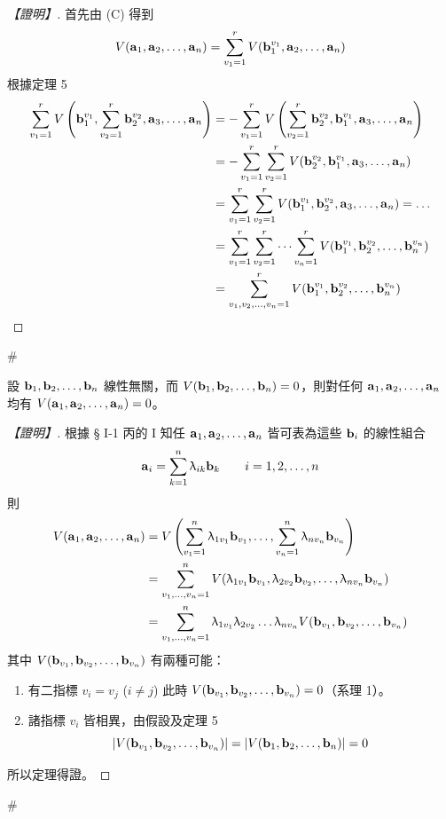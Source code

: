 \begin{proof}[【證明】]
首先由 (C) 得到
\[ V(\boldsymbol{\mathbf{a}}_1, \boldsymbol{\mathbf{a}}_2, \dots, \boldsymbol{\mathbf{a}}_n) = \sum_{v_1=1}^r V(\boldsymbol{\mathbf{b}}_1^{v_1}, \boldsymbol{\mathbf{a}}_2, \dots, \boldsymbol{\mathbf{a}}_n) \]
根據定理 5
\begin{align*}
\sum_{v_1=1}^r V\left(\boldsymbol{\mathbf{b}}_1^{v_1}, \sum_{v_2=1}^r \boldsymbol{\mathbf{b}}_2^{v_2}, \boldsymbol{\mathbf{a}}_3, \dots, \boldsymbol{\mathbf{a}}_n\right) &= - \sum_{v_1=1}^r V\left(\sum_{v_2=1}^r \boldsymbol{\mathbf{b}}_2^{v_2}, \boldsymbol{\mathbf{b}}_1^{v_1}, \boldsymbol{\mathbf{a}}_3, \dots, \boldsymbol{\mathbf{a}}_n\right) \\
&= - \sum_{v_1=1}^r \sum_{v_2=1}^r V(\boldsymbol{\mathbf{b}}_2^{v_2}, \boldsymbol{\mathbf{b}}_1^{v_1}, \boldsymbol{\mathbf{a}}_3, \dots, \boldsymbol{\mathbf{a}}_n) \\
&= \sum_{v_1=1}^r \sum_{v_2=1}^r V(\boldsymbol{\mathbf{b}}_1^{v_1}, \boldsymbol{\mathbf{b}}_2^{v_2}, \boldsymbol{\mathbf{a}}_3, \dots, \boldsymbol{\mathbf{a}}_n) = \dots \\
&= \sum_{v_1=1}^r \sum_{v_2=1}^r \dots \sum_{v_n=1}^r V(\boldsymbol{\mathbf{b}}_1^{v_1}, \boldsymbol{\mathbf{b}}_2^{v_2}, \dots, \boldsymbol{\mathbf{b}}_n^{v_n}) \\
&= \sum_{v_1, v_2, \dots, v_n=1}^r V(\boldsymbol{\mathbf{b}}_1^{v_1}, \boldsymbol{\mathbf{b}}_2^{v_2}, \dots, \boldsymbol{\mathbf{b}}_n^{v_n})
\end{align*}
\end{proof}\hfill$\#$

\begin{theorem}\label{thm:b6s-1-8}
設 $\boldsymbol{\mathbf{b}}_1, \boldsymbol{\mathbf{b}}_2, \dots, \boldsymbol{\mathbf{b}}_n$ 線性無關，而 $V(\boldsymbol{\mathbf{b}}_1, \boldsymbol{\mathbf{b}}_2, \dots, \boldsymbol{\mathbf{b}}_n) = 0$，則對任何 $\boldsymbol{\mathbf{a}}_1, \boldsymbol{\mathbf{a}}_2, \dots, \boldsymbol{\mathbf{a}}_n$ 均有 $V(\boldsymbol{\mathbf{a}}_1, \boldsymbol{\mathbf{a}}_2, \dots, \boldsymbol{\mathbf{a}}_n) = 0$。
\end{theorem}

\begin{proof}[【證明】]
根據 § I-1 丙的 I 知任 $\boldsymbol{\mathbf{a}}_1, \boldsymbol{\mathbf{a}}_2, \dots, \boldsymbol{\mathbf{a}}_n$ 皆可表為這些 $\boldsymbol{\mathbf{b}}_i$ 的線性組合
\begin{equation}
\boldsymbol{\mathbf{a}}_i = \sum_{k=1}^n \uplambda_{ik} \boldsymbol{\mathbf{b}}_k \qquad i=1, 2, \dots, n \label{eq:b6s-1-4-2}
\end{equation}
則
\begin{align*}
V(\boldsymbol{\mathbf{a}}_1, \boldsymbol{\mathbf{a}}_2, \dots, \boldsymbol{\mathbf{a}}_n) &= V\left(\sum_{v_1=1}^n \uplambda_{1v_1} \boldsymbol{\mathbf{b}}_{v_1}, \dots, \sum_{v_n=1}^n \uplambda_{nv_n} \boldsymbol{\mathbf{b}}_{v_n}\right) \\
&= \sum_{v_1, \dots, v_n=1}^n V(\uplambda_{1v_1} \boldsymbol{\mathbf{b}}_{v_1}, \uplambda_{2v_2} \boldsymbol{\mathbf{b}}_{v_2}, \dots, \uplambda_{nv_n} \boldsymbol{\mathbf{b}}_{v_n}) \\
&= \sum_{v_1, \dots, v_n=1}^n \uplambda_{1v_1} \uplambda_{2v_2} \dots \uplambda_{nv_n} V(\boldsymbol{\mathbf{b}}_{v_1}, \boldsymbol{\mathbf{b}}_{v_2}, \dots, \boldsymbol{\mathbf{b}}_{v_n})
\end{align*}
其中 $V(\boldsymbol{\mathbf{b}}_{v_1}, \boldsymbol{\mathbf{b}}_{v_2}, \dots, \boldsymbol{\mathbf{b}}_{v_n})$ 有兩種可能：
\begin{enumerate}[label=(\roman*), leftmargin=2em]
  \item 有二指標 $v_i = v_j$ ($i \ne j$) 此時 $V(\boldsymbol{\mathbf{b}}_{v_1}, \boldsymbol{\mathbf{b}}_{v_2}, \dots, \boldsymbol{\mathbf{b}}_{v_n}) = 0$（系理 1）。
  \item 諸指標 $v_i$ 皆相異，由假設及定理 5
  \[ |V(\boldsymbol{\mathbf{b}}_{v_1}, \boldsymbol{\mathbf{b}}_{v_2}, \dots, \boldsymbol{\mathbf{b}}_{v_n})| = |V(\boldsymbol{\mathbf{b}}_1, \boldsymbol{\mathbf{b}}_2, \dots, \boldsymbol{\mathbf{b}}_n)| = 0 \]
\end{enumerate}
所以定理得證。\end{proof}\hfill$\#$

